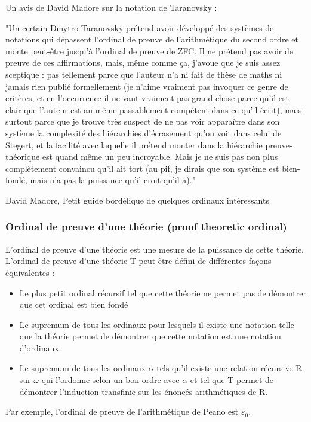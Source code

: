 \documentclass[12pt]{beamer}
\begin{document}
\begin{frame}
Un avis de David Madore sur la notation de Taranovsky :

\medskip
\footnotesize

"Un certain Dmytro Taranovsky prétend avoir développé des systèmes de notations qui dépassent l'ordinal de preuve de l'arithmétique du second ordre et monte peut-être jusqu'à l'ordinal de preuve de ZFC. Il ne prétend pas avoir de preuve de ces affirmations, mais, même comme ça, j'avoue que je suis assez sceptique : pas tellement parce que l'auteur n'a ni fait de thèse de maths ni jamais rien publié formellement (je n'aime vraiment pas invoquer ce genre de critères, et en l'occurrence il ne vaut vraiment pas grand-chose parce qu'il est clair que l'auteur est au même passablement compétent dans ce qu'il écrit), mais surtout parce que je trouve très suspect de ne pas voir apparaître dans son système la complexité des hiérarchies d'écrasement qu'on voit dans celui de Stegert, et la facilité avec laquelle il prétend monter dans la hiérarchie preuve-théorique est quand même un peu incroyable. Mais je ne suis pas non plus complètement convaincu qu'il ait tort (au pif, je dirais que son système est bien-fondé, mais n'a pas la puissance qu'il croit qu'il a)."

\medskip
\normalsize

David Madore, Petit guide bordélique de quelques ordinaux intéressants

\end{frame}
\begin{frame}
\frametitle{Ordinal de preuve d'une théorie (proof theoretic ordinal)}

\small

L'ordinal de preuve d'une théorie est une mesure de la puissance de cette théorie.
L'ordinal de preuve d'une théorie T peut être défini de différentes façons équivalentes :

\begin{itemize}
     \setlength{\itemsep}{1pt}
     \setlength{\parskip}{0pt}
     \setlength{\parsep}{0pt}
\item Le plus petit ordinal récursif tel que cette théorie ne permet pas de démontrer que cet ordinal est bien fondé
\item Le supremum de tous les ordinaux pour lesquels il existe une notation telle que la théorie permet de démontrer que cette notation est une notation d'ordinaux
\item Le supremum de tous les ordinaux $\alpha$ tels qu'il existe une relation récursive R sur $\omega$ qui l'ordonne selon un bon ordre avec $\alpha$ et tel que T permet de démontrer l'induction transfinie sur les énoncés arithmétiques de R.
\end{itemize}

Par exemple, l'ordinal de preuve de l'arithmétique de Peano est $\varepsilon_0$.

\end{frame}
\end{document}
